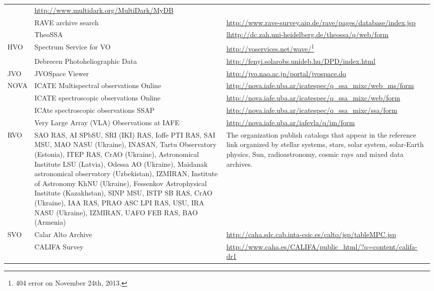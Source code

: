 \begin{longtable}{|m{2cm}|m{4.5cm}|m{7.5cm}|}
     & \url{http://www.multidark.org/MultiDark/MyDB} \\
     \cline{2-3}
     & RAVE archive search
     & \url{http://www.rave-survey.aip.de/rave/pages/database/index.jsp} \\
     \cline{2-3}
     & TheoSSA
     & \url{lhttp://dc.zah.uni-heidelberg.de/theossa/q/web/form} \\
     \hline
    \multirow{2}{*}{HVO} & Spectrum Service for VO
    & \url{http://voservices.net/wave/}\footnote{404 error on November 24th, 2013.} \\
    \cline{2-3}
     & Debrecen Photoheliographic Data
     & \url{http://fenyi.solarobs.unideb.hu/DPD/index.html} \\
     \hline
    JVO & JVOSpace Viewer
    & \url{http://jvo.nao.ac.jp/portal/jvospace.do} \\
    \hline
    \multirow{4}{*}{NOVA} & ICATE Multispectral observations Online 
    & \url{http://nova.iafe.uba.ar/icatespec/q_ssa_mixc/web_ms/form} \\
    \cline{2-3}
     & ICATE spectroscopic observations Online
     & \url{http://nova.iafe.uba.ar/icatespec/q_ssa_mixc/web/form} \\
     \cline{2-3}
     & ICAte spectroscopic observations SSAP
     & \url{http://nova.iafe.uba.ar/icatespec/q_ssa_mixc/ssa/form} \\
     \cline{2-3}
     & Very Large Array (VLA) Observations at IAFE 
     & \url{http://nova.iafe.uba.ar/iafevla/q/im/form} \\
     \hline
   RVO \cite{website:rvo-resources} & SAO RAS, AI SPbSU, SRI (IKI) RAS, Ioffe
   PTI RAS, SAI MSU, MAO NASU (Ukraine), INASAN, Tartu Observatory (Estonia),
   ITEP RAS, CrAO (Ukraine), Astronomical Institute LSU (Latvia), Odessa AO
   (Ukraine), Maidanak astronomical observatory (Uzbekistan), IZMIRAN, Institute
   of Astronomy KhNU (Ukraine), Fessenkov Astrophysical Institute (Kazakhstan),
   SINP MSU, ISTP SB RAS, CrAO (Ukraine), IAA RAS, PRAO ASC LPI RAS, USU, IRA
   NASU (Ukraine), IZMIRAN, UAFO FEB RAS, BAO (Armenia) & The organization
   publish catalogs that appear in the reference link organized by stellar
   systems, stars, solar system, solar-Earth physics, Sun, radioastronomy,
   cosmic rays and mixed data archives. \\
   \hline
   \multirow{14}{*}{SVO} & Calar Alto Archive
   & \url{http://caha.sdc.cab.inta-csic.es/calto/jsp/tableMPC.jsp} \\
   \cline{2-3}
    & CALIFA Survey
    & \url{http://www.caha.es/CALIFA/public_html/?q=content/califa-dr1} \\

\end{longtable}
